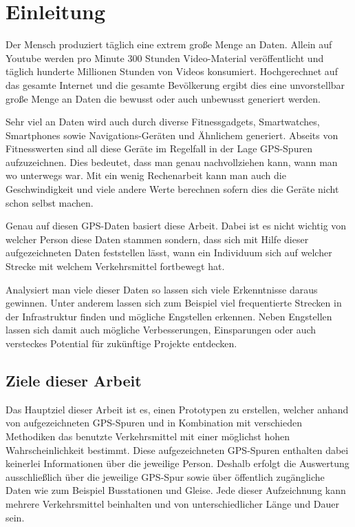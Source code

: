 \chapter{Einleitung}
Der Mensch produziert täglich eine extrem große Menge an Daten. Allein auf Youtube werden pro Minute 300 Stunden Video-Material veröffentlicht und täglich hunderte Millionen Stunden von Videos konsumiert.  \cite{youtube_statistics_2015} Hochgerechnet auf das gesamte Internet und die gesamte Bevölkerung ergibt dies eine unvorstellbar große Menge an Daten die bewusst oder auch unbewusst generiert werden. 

Sehr viel an Daten wird auch durch diverse Fitnessgadgets, Smartwatches, Smartphones sowie Navigations-Geräten und Ähnlichem generiert. Abseits von Fitnesswerten sind all diese Geräte im Regelfall in der Lage GPS-Spuren aufzuzeichnen. Dies bedeutet, dass man genau nachvollziehen kann, wann man wo unterwegs war. Mit ein wenig Rechenarbeit kann man auch die Geschwindigkeit und viele andere Werte berechnen sofern dies die Geräte nicht schon selbst machen. 

Genau auf diesen GPS-Daten basiert diese Arbeit. Dabei ist es nicht wichtig von welcher Person diese Daten stammen sondern, dass sich mit Hilfe dieser aufgezeichneten Daten feststellen lässt, wann ein Individuum sich auf welcher Strecke mit welchem Verkehrsmittel fortbewegt hat.

Analysiert man viele dieser Daten so lassen sich viele Erkenntnisse daraus gewinnen. Unter anderem lassen sich zum Beispiel viel frequentierte Strecken in der Infrastruktur finden und mögliche Engstellen erkennen. Neben Engstellen lassen sich damit auch mögliche Verbesserungen, Einsparungen oder auch versteckes Potential für zukünftige Projekte entdecken.

\section{Ziele dieser Arbeit}
Das Hauptziel dieser Arbeit ist es, einen Prototypen zu erstellen, welcher anhand von aufgezeichneten GPS-Spuren und in Kombination mit verschieden Methodiken das benutzte Verkehrsmittel mit einer möglichst hohen Wahrscheinlichkeit bestimmt. Diese aufgezeichneten GPS-Spuren enthalten dabei keinerlei Informationen über die jeweilige Person. Deshalb erfolgt die Auswertung ausschließlich über die jeweilige GPS-Spur sowie über öffentlich zugängliche Daten wie zum Beispiel Busstationen und Gleise. Jede dieser Aufzeichnung kann mehrere Verkehrsmittel beinhalten und von unterschiedlicher Länge und Dauer sein.

